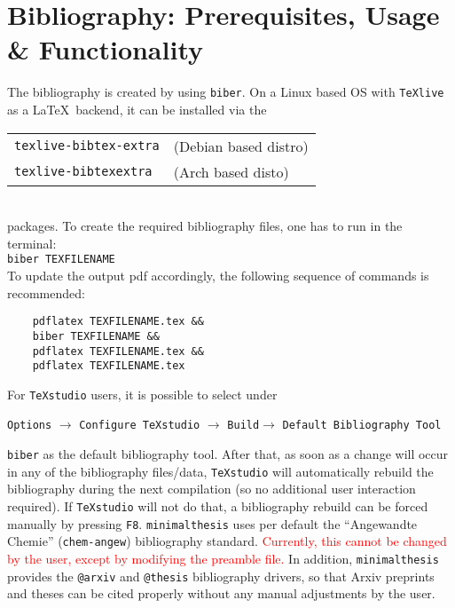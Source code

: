 \chapter{Bibliography: Prerequisites, Usage \& Functionality}
The bibliography is created by using \verb|biber|. On a Linux based OS with \verb|TeXlive| as a \LaTeX~backend, it can be installed via the\\[0.125cm]
\begin{tabular}{ll}
	\verb|texlive-bibtex-extra|& (Debian based distro)\\
	\verb|texlive-bibtexextra|& (Arch based disto)
\end{tabular}\\
packages.
\newline To create the required bibliography files, one has to run in the terminal:\\
\verb|biber TEXFILENAME|\\
To update the output pdf accordingly, the following sequence of commands is recommended:\\[-1cm]
\begin{verbatim}
	pdflatex TEXFILENAME.tex &&
	biber TEXFILENAME &&
	pdflatex TEXFILENAME.tex &&
	pdflatex TEXFILENAME.tex 
\end{verbatim} 
\vspace{-0.5cm}
For \verb|TeXstudio| users, it is possible to select under\\[-1cm]
\begin{center}
	\verb|Options| $\rightarrow$ 
	\verb|Configure TeXstudio| $\rightarrow$
	\verb|Build|$ \rightarrow$
	\verb|Default Bibliography Tool| 
\end{center}
\vspace{-0.5cm}
\verb|biber| as the default bibliography tool. After that, as soon as a change will occur in any of the bibliography files/data, \verb|TeXstudio| will automatically rebuild the bibliography during the next compilation (so no additional user interaction required). If \verb|TeXstudio| will not do that, a bibliography rebuild can be forced manually by pressing \verb|F8|.
\newline \verb|minimalthesis| uses per default the \enquote{Angewandte Chemie} (\verb|chem-angew|) bibliography standard. \textcolor{red}{Currently, this cannot be changed by the user, except by modifying the preamble file.} 
\newline In addition, \verb|minimalthesis| provides the \verb|@arxiv| \cite{arxivExample} and \verb|@thesis| \cite{thesisExample} bibliography drivers, so that Arxiv preprints and theses can be cited properly without any manual adjustments by the user.



